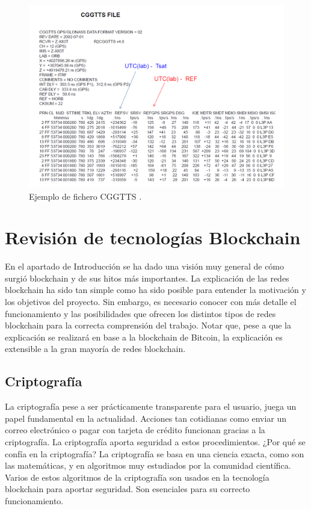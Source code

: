 \begin{figure}[H]
	\centering
	\includegraphics[width=1\textwidth]{imagenes/cggtts.PNG}
	\caption{\label{fig1}Ejemplo de fichero CGGTTS \cite{timetransfer}.}
\end{figure}



\section{Revisión de tecnologías Blockchain}

En el apartado de Introducción se ha dado una visión muy general de cómo surgió blockchain y de sus hitos más importantes. La explicación de las redes blockchain ha sido tan simple como ha sido posible para entender la motivación y los objetivos del proyecto. Sin embargo, es necesario conocer con más detalle el funcionamiento y las posibilidades que ofrecen los distintos tipos de redes blockchain para la correcta comprensión del trabajo. Notar que, pese a que la explicación se realizará en base a la blockchain de Bitcoin, la explicación es extensible a la gran mayoría de redes blockchain.

\subsection{Criptografía}

La criptografía pese a ser prácticamente transparente para el usuario, juega un papel fundamental en la actualidad. Acciones tan cotidianas como enviar un correo electrónico o pagar con tarjeta de crédito funcionan gracias a la criptografía. La criptografía aporta seguridad a estos procedimientos. ¿Por qué se confía en la criptografía? La criptografía se basa en una ciencia exacta, como son las matemáticas, y en algoritmos muy estudiados por la comunidad científica. Varios de estos algoritmos de la criptografía son usados en la tecnología blockchain para aportar seguridad. Son esenciales para su correcto funcionamiento.

